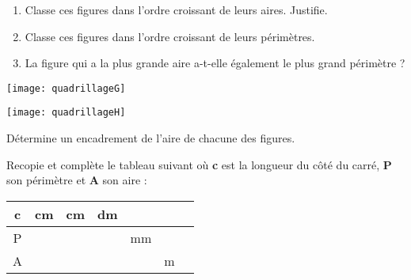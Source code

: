 \begin{exercice}[Comparaisons]
\begin{enumerate}
 \item Classe ces figures dans l'ordre croissant de leurs aires. Justifie.
 \item Classe ces figures dans l'ordre croissant de leurs périmètres.
 \item La figure qui a la plus grande aire a-t-elle également le plus grand périmètre ?
 \end{enumerate}
\begin{center} \texttt{[image: quadrillageG]} \end{center}
\end{exercice}

\begin{exercice}
\begin{center} \texttt{[image: quadrillageH]} \end{center}

Détermine un encadrement de l'aire de chacune des figures.
\end{exercice}




\begin{exercice}
Recopie et complète le tableau suivant où \textbf{\textcolor{C2}{c}} est la longueur du côté du carré, \textbf{\textcolor{C2}{P}} son périmètre et \textbf{\textcolor{C2}{A}} son aire :

\begin{center}
\begin{tabularx}{\linewidth}{|c|*{6}{>{\centering \arraybackslash}X|}}
\hline \cellcolor{BleuOuv} c & 4 cm & 7 cm & 9 dm & & \\
\hline \cellcolor{BleuOuv} P & & & & 32 mm & \\
\hline \cellcolor{BleuOuv} A & & & & & 36 m\up{2} \\
\hline
\end{tabularx} \\
\end{center}
\end{exercice}


